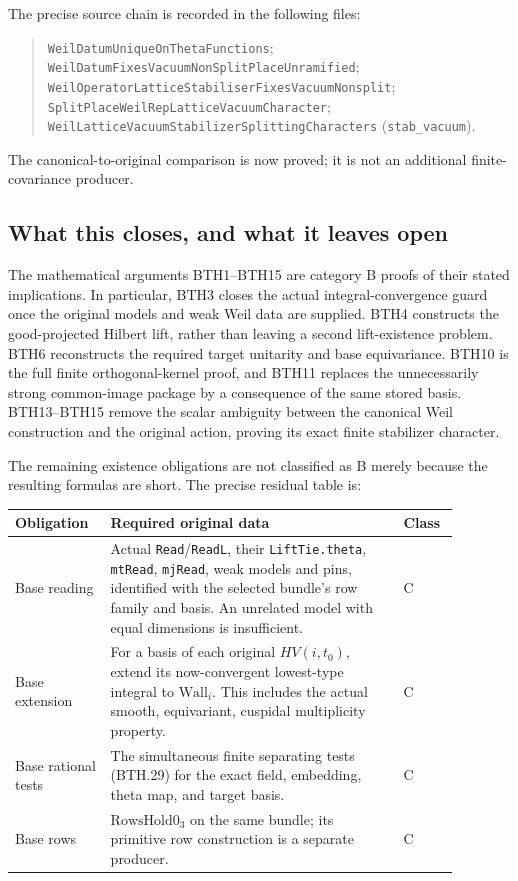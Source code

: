 The precise source chain is recorded in the following files:
\begin{quote}\small
\texttt{WeilDatumUniqueOnThetaFunctions};\\
\texttt{WeilDatumFixesVacuumNonSplitPlaceUnramified};\\
\texttt{WeilOperatorLatticeStabiliserFixesVacuumNonsplit};\\
\texttt{SplitPlaceWeilRepLatticeVacuumCharacter};\\
\texttt{WeilLatticeVacuumStabilizerSplittingCharacters}
(\texttt{stab\_vacuum}).
\end{quote}
The canonical-to-original comparison is now proved;
it is not an additional finite-covariance producer.

\subsection*{What this closes, and what it leaves open}

The mathematical arguments BTH1--BTH15 are category B
proofs of their stated implications.  In particular,
BTH3 closes the actual integral-convergence guard
once the original models and weak Weil data are
supplied.  BTH4 constructs the good-projected Hilbert
lift, rather than leaving a second lift-existence
problem.  BTH6 reconstructs the required target
unitarity and base equivariance.  BTH10 is the full
finite orthogonal-kernel proof, and BTH11 replaces
the unnecessarily strong common-image package by
a consequence of the same stored basis.
BTH13--BTH15 remove the scalar ambiguity between
the canonical Weil construction and the original
action, proving its exact finite stabilizer character.

The remaining existence obligations are not classified
as B merely because the resulting formulas are short.
The precise residual table is:

\begin{center}
\begin{tabular}{p{0.18\linewidth}p{0.60\linewidth}p{0.10\linewidth}}
\hline
Obligation & Required original data & Class\\ \hline
Base reading &
Actual \texttt{Read}/\texttt{Read\allowbreak L}, their
\texttt{Lift\allowbreak Tie.theta}, \texttt{mt\allowbreak Read}, \texttt{mj\allowbreak Read},
weak models and pins, identified with the selected
bundle's row family and basis.  An unrelated model
with equal dimensions is insufficient. & C\\
Base extension &
For a basis of each original \(HV(i,t_0)\), extend
its now-convergent lowest-type integral to
\(\mathrm{Wall}_i\).  This includes the actual
smooth, equivariant, cuspidal multiplicity property. & C\\
Base rational tests &
The simultaneous finite separating tests (BTH.29)
for the exact field, embedding, theta map, and
target basis. & C\\
Base rows &
\(\mathrm{RowsHold0}_3\) on the same bundle;
its primitive row construction is a separate
producer. & C\\ \hline
\end{tabular}
\end{center}

